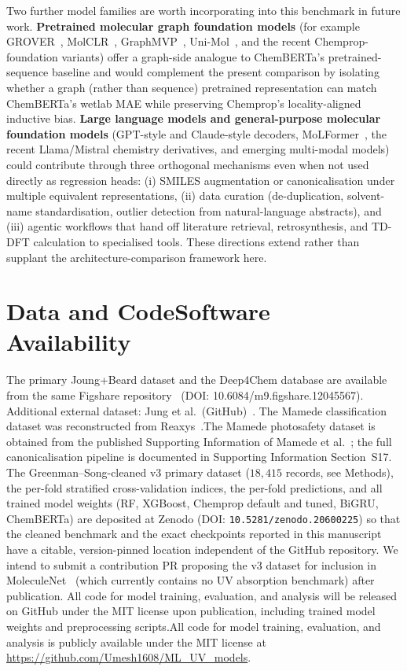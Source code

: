 \documentclass[journal=jcisd8,manuscript=article]{achemso}
\newcommand{\added}[1]{{\color{addedblue}#1}}
\newcommand{\removed}[1]{{\color{removedred}#1}}
\begin{document}
\added{Two further model families are worth incorporating into this benchmark in future work. \textbf{Pretrained molecular graph foundation models} (for example GROVER~\cite{rong2020grover}, MolCLR~\cite{wang2022molecular}, GraphMVP~\cite{liu2021pretraining}, Uni-Mol~\cite{zhou2023unimol}, and the recent Chemprop-foundation variants) offer a graph-side analogue to ChemBERTa's pretrained-sequence baseline and would complement the present comparison by isolating whether a graph (rather than sequence) pretrained representation can match ChemBERTa's wetlab MAE while preserving Chemprop's locality-aligned inductive bias. \textbf{Large language models and general-purpose molecular foundation models} (GPT-style and Claude-style decoders, MoLFormer~\cite{ross2022molformer}, the recent Llama/Mistral chemistry derivatives, and emerging multi-modal models) could contribute through three orthogonal mechanisms even when not used directly as regression heads: (i) SMILES augmentation or canonicalisation under multiple equivalent representations, (ii) data curation (de-duplication, solvent-name standardisation, outlier detection from natural-language abstracts), and (iii) agentic workflows that hand off literature retrieval, retrosynthesis, and TD-DFT calculation to specialised tools. These directions extend rather than supplant the architecture-comparison framework here.}


\section*{Data and \removed{Code}\added{Software} Availability}
The primary Joung+Beard dataset and the Deep4Chem database are available from the same Figshare repository~\cite{joung2020experimental, beard2019comparative} (DOI: 10.6084/m9.figshare.12045567).
Additional external dataset: Jung et al.\ (GitHub)~\cite{jung2024machine}.
\removed{The Mamede classification dataset was reconstructed from Reaxys~\cite{mamede2021machine}.}\added{The Mamede photosafety dataset is obtained from the published Supporting Information of Mamede et al.~\cite{mamede2021machine}; the full canonicalisation pipeline is documented in Supporting Information Section~S17.}
\added{The Greenman--Song-cleaned v3 primary dataset ($18{,}415$ records, see Methods), the per-fold stratified cross-validation indices, the per-fold predictions, and all trained model weights (RF, XGBoost, Chemprop default and tuned, BiGRU, ChemBERTa) are deposited at Zenodo (DOI: \texttt{10.5281/zenodo.20600225}) so that the cleaned benchmark and the exact checkpoints reported in this manuscript have a citable, version-pinned location independent of the GitHub repository. We intend to submit a contribution PR proposing the v3 dataset for inclusion in MoleculeNet~\cite{wuMoleculeNet2018} (which currently contains no UV absorption benchmark) after publication.}
\removed{All code for model training, evaluation, and analysis will be released on GitHub under the MIT license upon publication, including trained model weights and preprocessing scripts.}\added{All code for model training, evaluation, and analysis is publicly available under the MIT license at \url{https://github.com/Umesh1608/ML_UV_models}.}
\end{document}
